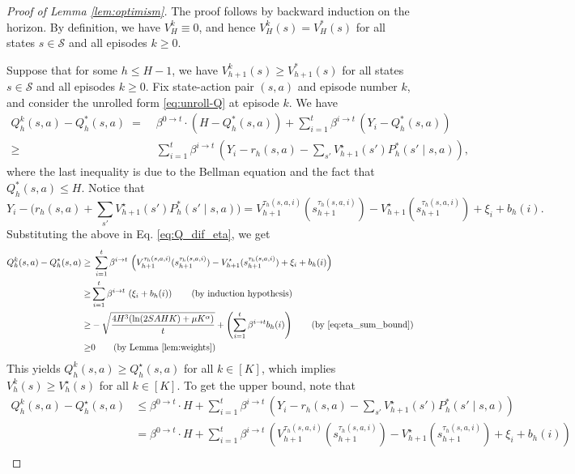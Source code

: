 \documentclass[11pt]{article}
\newcommand{\lr}{\beta}
\begin{document}
\begin{proof}[Proof of Lemma \ref{lem:optimism}]
The proof follows by backward induction on the horizon. By definition, we have $V_{H}^k\equiv 0$, and hence $V_H^k(s)=V^*_H(s)$ for all states $s\in\mathcal{S}$ and all episodes $k\geq 0$. 

Suppose that for some $h\leq H-1$, we have $V_{h+1}^k(s)\geq V^*_{h+1}(s)$ for all states $s\in\mathcal{S}$ and all episodes $k\geq 0$. Fix state-action pair $(s,a)$ and episode number $k$, and consider the unrolled form \eqref{eq:unroll-Q} at episode $k$. We have
\begin{align}
Q_h^k(s,a)-Q_h^*(s,a)
\;=&\;
\lr^{0\rightarrow t}\cdot (H-Q_h^*(s,a)) + \sum_{i=1}^t \lr^{i\rightarrow t} \, (Y_i-Q_h^*(s,a))\nonumber\\
\geq &\; \sum_{i=1}^t \lr^{i\rightarrow t} \, \left(Y_i-r_h(s,a)-\sum_{s'}V_{h+1}^\star(s') P_h^*(s'\mid s,a)\right),\label{eq:Q_dif_eta}
\end{align}
where the last inequality is due to the Bellman equation and the fact that $Q^*_h(s,a)\leq H$. Notice that
\[
Y_i - \Big(r_h(s,a)+\sum_{s'}V_{h+1}^\star(s') P_h^*(s'\mid s,a)\Big)
=
V_{h+1}^{\tau_h(s,a,i)}(s_{h+1}^{\tau_h(s,a,i)})-V_{h+1}^\star(s_{h+1}^{\tau_h(s,a,i)})
+\xi_i + b_h(i).
\]
Substituting the above in Eq. \eqref{eq:Q_dif_eta}, we get 
\begin{align}
Q_h^k(s,a)-Q_h^*(s,a)\geq &\; \sum_{i=1}^t \lr^{i\rightarrow t} \, \left(V_{h+1}^{\tau_h(s,a,i)}(s_{h+1}^{\tau_h(s,a,i)})-V_{h+1}^\star(s_{h+1}^{\tau_h(s,a,i)})
+\xi_i + b_h(i)\right)\nonumber\\
\geq & \sum_{i=1}^t \lr^{i\rightarrow t} \, \left(
\xi_i + b_h(i)\right)\tag{by induction hypothesis}\\
\geq & -\sqrt{\frac{4H^3(\ln(2SAHK)+\mu K^\alpha)}{t}} +  \left(\sum_{i=1}^t \lr^{i\rightarrow t} b_h(i)\right) \tag{by \eqref{eq:eta_sum_bound}}\\
\geq & 0 \tag{by Lemma \ref{lem:weights}}
\end{align}
This yields $Q_h^k(s,a)\ge Q_h^\star(s,a)$ for all $k\in[K]$, which implies $V_h^k(s)\ge V_h^\star(s)$ for all $k\in[K]$. To get the upper bound, note that
\begin{align*}
    Q_h^k(s,a) - Q_h^\star(s,a) &\leq \lr^{0\rightarrow t}\cdot H  + \sum_{i=1}^t \lr^{i\rightarrow t} \, \left(Y_i-r_h(s,a)-\sum_{s'}V_{h+1}^\star(s') P_h^*(s'\mid s,a)\right)\\
    &= \lr^{0\rightarrow t}\cdot H  + \sum_{i=1}^t \lr^{i\rightarrow t} \, \left(V_{h+1}^{\tau_h(s,a,i)}(s_{h+1}^{\tau_h(s,a,i)})-V_{h+1}^\star(s_{h+1}^{\tau_h(s,a,i)}) + \xi_i + b_h(i)\right)\\

\end{align*}
\end{proof}
\end{document}
